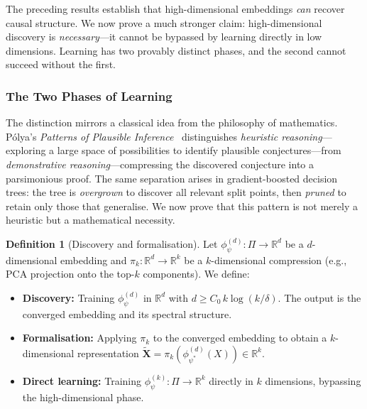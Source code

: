 \documentclass[11pt,a4paper]{article}
\theoremstyle{plain}
\theoremstyle{definition}
\newtheorem{definition}[theorem]{Definition}
\theoremstyle{remark}
\newcommand{\R}{\mathbb{R}}
\begin{document}
The preceding results establish that high-dimensional embeddings \emph{can}
recover causal structure.  We now prove a much stronger claim: high-dimensional
discovery is \emph{necessary}---it cannot be bypassed by learning directly in
low dimensions.  Learning has two provably distinct phases, and the second
cannot succeed without the first.

\subsubsection{The Two Phases of Learning}

The distinction mirrors a classical idea from the philosophy of mathematics.
P\'olya's \emph{Patterns of Plausible Inference}~\citep{polya1954patterns}
distinguishes \emph{heuristic reasoning}---exploring a large space of
possibilities to identify plausible conjectures---from \emph{demonstrative
reasoning}---compressing the discovered conjecture into a parsimonious proof.
The same separation arises in gradient-boosted decision trees: the tree is
\emph{overgrown} to discover all relevant split points, then \emph{pruned} to
retain only those that generalise.  We now prove that this pattern is not merely
a heuristic but a mathematical necessity.

\begin{definition}[Discovery and formalisation]\label{def:disc-form}
Let $\phi_\psi^{(d)} : \Pi \to \R^d$ be a $d$-dimensional embedding and
$\pi_k : \R^d \to \R^k$ be a $k$-dimensional compression (e.g., PCA projection
onto the top-$k$ components).  We define:
\begin{itemize}[leftmargin=2em]
  \item \textbf{Discovery:} Training $\phi_\psi^{(d)}$ in $\R^d$ with
    $d \geq C_0\,k\log(k/\delta)$.  The output is the converged embedding and
    its spectral structure.
  \item \textbf{Formalisation:} Applying $\pi_k$ to the converged embedding to
    obtain a $k$-dimensional representation
    $\tilde{\mathbf{X}} = \pi_k(\phi_{\psi^*}^{(d)}(X)) \in \R^k$.
  \item \textbf{Direct learning:} Training $\phi_\psi^{(k)} : \Pi \to \R^k$
    directly in $k$ dimensions, bypassing the high-dimensional phase.
\end{itemize}
\end{definition}
\end{document}
